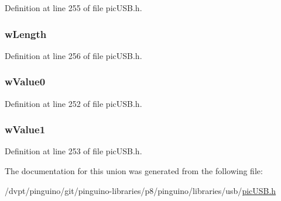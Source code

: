 Definition at line 255 of file pic\-U\-S\-B.\-h.

\hypertarget{unionsetup_packet_struct_a9fafd313816c51f76e621935f33a634a}{
\subsubsection[{w\-Length}]{ w\-Length}}\label{unionsetup_packet_struct_a9fafd313816c51f76e621935f33a634a}


Definition at line 256 of file pic\-U\-S\-B.\-h.

\hypertarget{unionsetup_packet_struct_a9ec22823f856325394796ecddc8c7cee}{
\subsubsection[{w\-Value0}]{ w\-Value0}}\label{unionsetup_packet_struct_a9ec22823f856325394796ecddc8c7cee}


Definition at line 252 of file pic\-U\-S\-B.\-h.

\hypertarget{unionsetup_packet_struct_ae02c3c2f43b18232e17336ffe81c72ea}{
\subsubsection[{w\-Value1}]{ w\-Value1}}\label{unionsetup_packet_struct_ae02c3c2f43b18232e17336ffe81c72ea}


Definition at line 253 of file pic\-U\-S\-B.\-h.



The documentation for this union was generated from the following file\-:\begin{DoxyCompactItemize}
\item 
/dvpt/pinguino/git/pinguino-\/libraries/p8/pinguino/libraries/usb/\hyperlink{pic_u_s_b_8h}{pic\-U\-S\-B.\-h}\end{DoxyCompactItemize}
